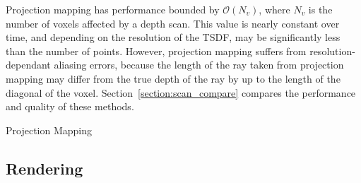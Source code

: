 \documentclass[10pt,twocolumn,letterpaper]{article}
\newcommand{\sref}[1]{Section~\ref{#1}}
\begin{document}
Projection mapping has performance bounded by $\mathcal{O}(N_v)$, where $N_v$ is
the number of voxels affected by a depth scan. This value is nearly constant
over time, and depending on the resolution of the TSDF, may be significantly
less than the number of points. However, projection mapping suffers from resolution-dependant aliasing errors,
because the length of the ray taken from projection mapping may differ from the
true depth of the ray by up to the length of the diagonal of the voxel.  
\sref{section:scan_compare} compares the performance and quality of
these methods.

\begin{algorithm} 
	\caption{Projection Mapping}
	\label{alg:projection_mapping}
	\begin{algorithmic}[1]
		 
		  
	     
		    	\label{alg:line:voxel_carve}
			\EndIf
	    \EndIf
		  
			\label{alg:line:tsdf_update}
		\EndIf
	\EndFor
	\end{algorithmic}
\end{algorithm}
\subsection{Rendering}
\label{section:render}
\end{document}
